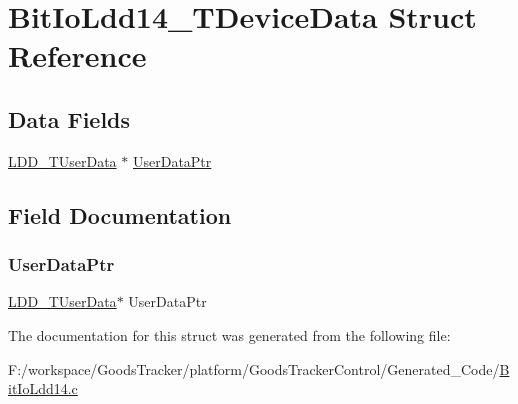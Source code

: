 \hypertarget{struct_bit_io_ldd14___t_device_data}{}\section{Bit\+Io\+Ldd14\+\_\+\+T\+Device\+Data Struct Reference}
\label{struct_bit_io_ldd14___t_device_data}
\subsection*{Data Fields}
\begin{DoxyCompactItemize}
\item 
\hyperlink{group___p_e___types__module_ga0b66a73f87238a782318aa0be7578e35}{L\+D\+D\+\_\+\+T\+User\+Data} $\ast$ \hyperlink{struct_bit_io_ldd14___t_device_data_a8e77b9d030b00c231823350a904e0f83}{User\+Data\+Ptr}
\end{DoxyCompactItemize}


\subsection{Field Documentation}
\mbox{\label{struct_bit_io_ldd14___t_device_data_a8e77b9d030b00c231823350a904e0f83}} 
\subsubsection{\texorpdfstring{User\+Data\+Ptr}{UserDataPtr}}
{\footnotesize\ttfamily \hyperlink{group___p_e___types__module_ga0b66a73f87238a782318aa0be7578e35}{L\+D\+D\+\_\+\+T\+User\+Data}$\ast$ User\+Data\+Ptr}



The documentation for this struct was generated from the following file\+:\begin{DoxyCompactItemize}
\item 
F\+:/workspace/\+Goods\+Tracker/platform/\+Goods\+Tracker\+Control/\+Generated\+\_\+\+Code/\hyperlink{_bit_io_ldd14_8c}{Bit\+Io\+Ldd14.\+c}\end{DoxyCompactItemize}
